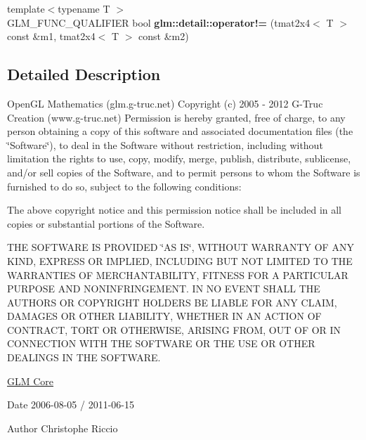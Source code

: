 \begin{DoxyCompactItemize}
\item 
\hypertarget{namespaceglm_1_1detail_a09a22ccea6a744560cb579b24da8f30a}{{\footnotesize template$<$typename T $>$ }\\G\-L\-M\-\_\-\-F\-U\-N\-C\-\_\-\-Q\-U\-A\-L\-I\-F\-I\-E\-R bool {\bfseries glm\-::detail\-::operator!=} (tmat2x4$<$ T $>$ const \&m1, tmat2x4$<$ T $>$ const \&m2)}\label{namespaceglm_1_1detail_a09a22ccea6a744560cb579b24da8f30a}

\end{DoxyCompactItemize}


\subsection{Detailed Description}
Open\-G\-L Mathematics (glm.\-g-\/truc.\-net) Copyright (c) 2005 -\/ 2012 G-\/\-Truc Creation (www.\-g-\/truc.\-net) Permission is hereby granted, free of charge, to any person obtaining a copy of this software and associated documentation files (the \char`\"{}\-Software\char`\"{}), to deal in the Software without restriction, including without limitation the rights to use, copy, modify, merge, publish, distribute, sublicense, and/or sell copies of the Software, and to permit persons to whom the Software is furnished to do so, subject to the following conditions\-:

The above copyright notice and this permission notice shall be included in all copies or substantial portions of the Software.

T\-H\-E S\-O\-F\-T\-W\-A\-R\-E I\-S P\-R\-O\-V\-I\-D\-E\-D \char`\"{}\-A\-S I\-S\char`\"{}, W\-I\-T\-H\-O\-U\-T W\-A\-R\-R\-A\-N\-T\-Y O\-F A\-N\-Y K\-I\-N\-D, E\-X\-P\-R\-E\-S\-S O\-R I\-M\-P\-L\-I\-E\-D, I\-N\-C\-L\-U\-D\-I\-N\-G B\-U\-T N\-O\-T L\-I\-M\-I\-T\-E\-D T\-O T\-H\-E W\-A\-R\-R\-A\-N\-T\-I\-E\-S O\-F M\-E\-R\-C\-H\-A\-N\-T\-A\-B\-I\-L\-I\-T\-Y, F\-I\-T\-N\-E\-S\-S F\-O\-R A P\-A\-R\-T\-I\-C\-U\-L\-A\-R P\-U\-R\-P\-O\-S\-E A\-N\-D N\-O\-N\-I\-N\-F\-R\-I\-N\-G\-E\-M\-E\-N\-T. I\-N N\-O E\-V\-E\-N\-T S\-H\-A\-L\-L T\-H\-E A\-U\-T\-H\-O\-R\-S O\-R C\-O\-P\-Y\-R\-I\-G\-H\-T H\-O\-L\-D\-E\-R\-S B\-E L\-I\-A\-B\-L\-E F\-O\-R A\-N\-Y C\-L\-A\-I\-M, D\-A\-M\-A\-G\-E\-S O\-R O\-T\-H\-E\-R L\-I\-A\-B\-I\-L\-I\-T\-Y, W\-H\-E\-T\-H\-E\-R I\-N A\-N A\-C\-T\-I\-O\-N O\-F C\-O\-N\-T\-R\-A\-C\-T, T\-O\-R\-T O\-R O\-T\-H\-E\-R\-W\-I\-S\-E, A\-R\-I\-S\-I\-N\-G F\-R\-O\-M, O\-U\-T O\-F O\-R I\-N C\-O\-N\-N\-E\-C\-T\-I\-O\-N W\-I\-T\-H T\-H\-E S\-O\-F\-T\-W\-A\-R\-E O\-R T\-H\-E U\-S\-E O\-R O\-T\-H\-E\-R D\-E\-A\-L\-I\-N\-G\-S I\-N T\-H\-E S\-O\-F\-T\-W\-A\-R\-E.

\hyperlink{group__core}{G\-L\-M Core}

\begin{DoxyDate}{Date}
2006-\/08-\/05 / 2011-\/06-\/15 
\end{DoxyDate}
\begin{DoxyAuthor}{Author}
Christophe Riccio 
\end{DoxyAuthor}
